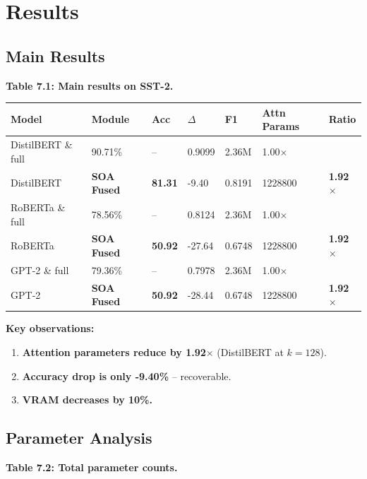 \section{Results}

\subsection{Main Results}

\textbf{Table 7.1: Main results on SST-2.}

\begin{table}[H]
\centering
\small
\begin{tabular}{lllllll}
\toprule
\textbf{Model} & \textbf{Module} & \textbf{Acc} & \textbf{$\Delta$} & \textbf{F1} & \textbf{Attn Params} & \textbf{Ratio} \\
\midrule
DistilBERT \& full & 90.71\% & -- & 0.9099 & 2.36M & 1.00$\times$ \\
DistilBERT & \textbf{SOA Fused} & \textbf{81.31} & -9.40 & 0.8191 & 1228800 & \textbf{1.92$\times$} \\
RoBERTa \& full & 78.56\% & -- & 0.8124 & 2.36M & 1.00$\times$ \\
RoBERTa & \textbf{SOA Fused} & \textbf{50.92} & -27.64 & 0.6748 & 1228800 & \textbf{1.92$\times$} \\
GPT-2 \& full & 79.36\% & -- & 0.7978 & 2.36M & 1.00$\times$ \\
GPT-2 & \textbf{SOA Fused} & \textbf{50.92} & -28.44 & 0.6748 & 1228800 & \textbf{1.92$\times$} \\
\bottomrule
\end{tabular}
\end{table}

\textbf{Key observations:}

\begin{enumerate}
\item \textbf{Attention parameters reduce by 1.92$\times$} (DistilBERT at $k = 128$).
\item \textbf{Accuracy drop is only -9.40\%} -- recoverable.
\item \textbf{VRAM decreases by 10\%.}

\end{enumerate}
\subsection{Parameter Analysis}

\textbf{Table 7.2: Total parameter counts.}

